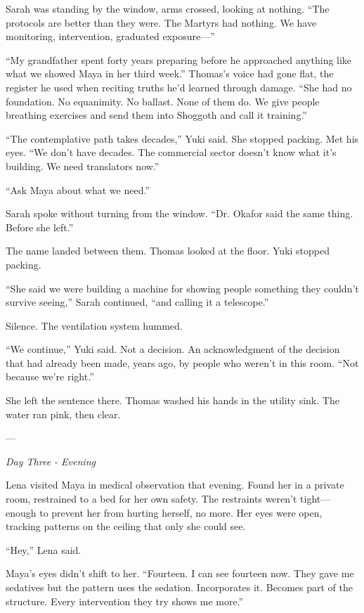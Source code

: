 Sarah was standing by the window, arms crossed, looking at nothing. ``The protocols are better than they were. The Martyrs had nothing. We have monitoring, intervention, graduated exposure---''

``My grandfather spent forty years preparing before he approached anything like what we showed Maya in her third week.'' Thomas's voice had gone flat, the register he used when reciting truths he'd learned through damage. ``She had no foundation. No equanimity. No ballast. None of them do. We give people breathing exercises and send them into Shoggoth and call it training.''

``The contemplative path takes decades,'' Yuki said. She stopped packing. Met his eyes. ``We don't have decades. The commercial sector doesn't know what it's building. We need translators now.''

``Ask Maya about what we need.''

Sarah spoke without turning from the window. ``Dr. Okafor said the same thing. Before she left.''

The name landed between them. Thomas looked at the floor. Yuki stopped packing.

``She said we were building a machine for showing people something they couldn't survive seeing,'' Sarah continued, ``and calling it a telescope.''

Silence. The ventilation system hummed.

``We continue,'' Yuki said. Not a decision. An acknowledgment of the decision that had already been made, years ago, by people who weren't in this room. ``Not because we're right.''

She left the sentence there. Thomas washed his hands in the utility sink. The water ran pink, then clear.

---

\textit{Day Three - Evening}

Lena visited Maya in medical observation that evening. Found her in a private room, restrained to a bed for her own safety. The restraints weren't tight—enough to prevent her from hurting herself, no more. Her eyes were open, tracking patterns on the ceiling that only she could see.

``Hey,'' Lena said.

Maya's eyes didn't shift to her. ``Fourteen. I can see fourteen now. They gave me sedatives but the pattern uses the sedation. Incorporates it. Becomes part of the structure. Every intervention they try shows me more.''

